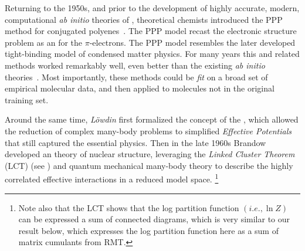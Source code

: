 Returning to the 1950s, and prior to the development of highly accurate, modern,
computational \emph{ab initio} theories of \QuantumChemistry, %
theoretical chemists introduced the \SemiEmpirical PPP method
for
conjugated polyenes~\cite{PariserParr53}.
The PPP model recast the electronic structure problem as an \emph{\EffectiveHamiltonian}
for the $\pi$-electrons.
The PPP model resembles the later developed tight-binding model of condensed matter physics\cite{Hubbard1963}.
For many years this and related \SemiEmpirical methods
worked remarkably well, even better than the existing \emph{ab initio}
theories~\cite{Dewar1975,Ridley1973,Stewart1990,Warshel1976}.
Most importantly, these methods could be \emph{fit}
on a broad set of empirical molecular data, and then applied to molecules not in the original training set.

Around the same time, \emph{Löwdin} first formalized the concept of the \EffectiveHamiltonian,
which allowed the reduction of complex many-body problems to simplified
\emph{Effective Potentials} that still captured the essential physics.
Then in the late 1960s Brandow 
developed an \EffectiveHamiltonian theory of
nuclear structure, 
leveraging the \emph{Linked Cluster Theorem} (LCT) (see \cite{Hubbard1959}) and quantum mechanical many-body theory
to describe the highly correlated effective interactions in a reduced model space.
\footnote{Note also that the LCT shows that the log partition function $(i.e., \ln Z)$ can be expressed
a sum of connected diagrams, which is very similar to our result below, which expresses the
log partition function here as a sum of matrix cumulants from RMT.}

